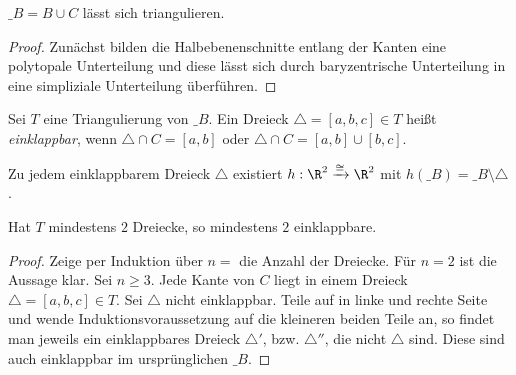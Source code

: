 \begin{lem}
	$\_B = B \cup C$ lässt sich triangulieren.
	\begin{proof}
		Zunächst bilden die Halbebenenschnitte entlang der Kanten eine polytopale Unterteilung und diese lässt sich durch baryzentrische Unterteilung in eine simpliziale Unterteilung überführen.
	\end{proof}
\end{lem}

\begin{df}
	Sei $T$ eine Triangulierung von $\_B$.
	Ein Dreieck $\triangle = [a,b,c] \in T$ heißt \emph{einklappbar}, wenn $\triangle \cap C = [a,b]$ oder $\triangle \cap C = [a,b] \cup [b,c]$.
\end{df}

\begin{lem}
	Zu jedem einklappbarem Dreieck $\triangle$ existiert $h: \R^2 \homeomorphicto \R^2$ mit $h(\_B) = \_{B \setminus \triangle}$.
\end{lem}

\begin{lem}
	Hat $T$ mindestens $2$ Dreiecke, so mindestens $2$ einklappbare.
	\begin{proof}
		Zeige per Induktion über $n = $ die Anzahl der Dreiecke.
		Für $n = 2$ ist die Aussage klar.
		Sei $n \ge 3$.
		Jede Kante von $C$ liegt in einem Dreieck $\triangle = [a,b,c] \in T$.
		Sei $\triangle$ \oBdA nicht einklappbar.
		Teile auf in linke und rechte Seite und wende Induktionsvoraussetzung auf die kleineren beiden Teile an, so findet man jeweils ein einklappbares Dreieck $\triangle'$, bzw. $\triangle''$, die nicht $\triangle$ sind.
		Diese sind auch einklappbar im ursprünglichen $\_B$.
	\end{proof}
\end{lem}

